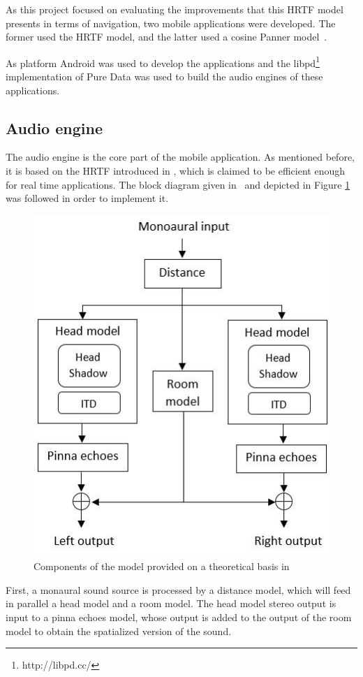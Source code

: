 \documentclass[journal]{IEEEtran}
\begin{document}
As this project focused on evaluating the improvements that this HRTF model presents in terms of navigation, two mobile applications were developed. The former used the HRTF model, and the latter used a cosine Panner model~\cite{AndyFarnell2010}. 

As platform Android was used to develop the applications and the libpd\footnote{http://libpd.cc/} implementation of Pure Data was used to build the audio engines of these applications.

\subsection{Audio engine}
The audio engine is the core part of the mobile application. As mentioned before, it is based on the HRTF introduced in \cite{Brown1997}, which is claimed to be efficient enough for real time applications. The block diagram given in~\cite{Brown1997} and depicted in Figure \ref{fig:workflow} was followed in order to implement it.

\begin{figure}[h!]
\centering
\includegraphics[scale=0.55]{graphics/graphic.jpg}
\caption{Components of the model provided on a theoretical basis in~\cite{Brown1997}}
\label{fig:workflow}
\end{figure}

First, a monaural sound source is processed by a distance model, which will feed in parallel a head model and a room model. The head model stereo output is input to a pinna echoes model, whose output is added to the output of the room model to obtain the spatialized version of the sound.
\end{document}

